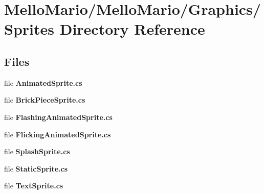 \section{Mello\+Mario/\+Mello\+Mario/\+Graphics/\+Sprites Directory Reference}
\label{dir_944bd8f4d23f728460f1cfec85a7dd8e}
\subsection*{Files}
\begin{DoxyCompactItemize}
\item 
file \textbf{ Animated\+Sprite.\+cs}
\item 
file \textbf{ Brick\+Piece\+Sprite.\+cs}
\item 
file \textbf{ Flashing\+Animated\+Sprite.\+cs}
\item 
file \textbf{ Flicking\+Animated\+Sprite.\+cs}
\item 
file \textbf{ Splash\+Sprite.\+cs}
\item 
file \textbf{ Static\+Sprite.\+cs}
\item 
file \textbf{ Text\+Sprite.\+cs}
\end{DoxyCompactItemize}
